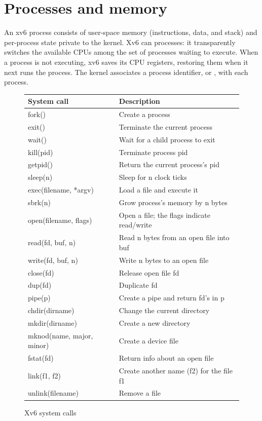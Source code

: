 \section{Processes and memory}

An xv6 process consists of user-space memory (instructions, data, and stack)
and per-process state private to the kernel.
Xv6 can
processes: it transparently switches the available CPUs
among the set of processes waiting to execute.
When a process is not executing, xv6 saves its CPU registers,
restoring them when it next runs the process.
The kernel associates a process identifier, or
,
with each process.

\begin{figure}[t]
\center
\begin{tabular}{ll}
{\bf System call} & {\bf Description} \\
\midrule
fork() & Create a process \\
exit() & Terminate the current process \\
wait() & Wait for a child process to exit \\
kill(pid) & Terminate process pid \\
getpid() & Return the current process's pid \\
sleep(n) & Sleep for n clock ticks \\
exec(filename, *argv) & Load a file and execute it \\
sbrk(n) & Grow process's memory by n bytes \\
open(filename, flags) & Open a file; the flags indicate read/write \\
read(fd, buf, n) & Read n bytes from an open file into buf \\
write(fd, buf, n) & Write n bytes to an open file \\
close(fd) & Release open file fd \\
dup(fd) & Duplicate fd \\
pipe(p) & Create a pipe and return fd's in p \\
chdir(dirname) & Change the current directory \\
mkdir(dirname) & Create a new directory \\
mknod(name, major, minor) & Create a device file \\
fstat(fd) & Return info about an open file \\
link(f1, f2) & Create another name (f2) for the file f1 \\
unlink(filename) & Remove a file \\
\end{tabular}
\caption{Xv6 system calls}
\label{fig:api}
\end{figure}

